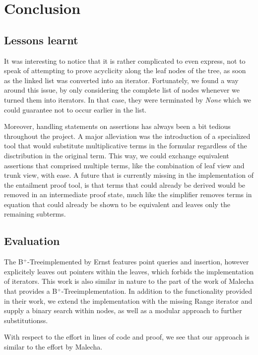\documentclass[a4paper,UKenglish,cleveref, autoref, thm-restate]{lipics-v2021}
\newcommand{\btree}{B$^+$-Tree}
\begin{document}
\section{Conclusion}
\label{sec:conclusion}

\subsection{Lessons learnt}

It was interesting to notice that it is rather complicated
to even express, not to speak of attempting to prove acyclicity
 along the leaf nodes of the tree, as soon as the linked list was converted into an iterator.
Fortunately, we found a way around this issue, by only considering
the complete list of nodes whenever we turned them into
iterators. In that case, they were terminated by \textit{None}
which we could guarantee not to occur earlier in the list.

Moreover, handling statements on assertions has always been
a bit tedious throughout the project.
A major alleviation was the introduction of a specialized tool
that would substitute multiplicative terms in the formular
regardless of the disctribution in the original term.
This way, we could exchange equivalent assertions that comprised
multiple terms, like the combination of leaf view and trunk view,
with ease.
A future that is currently missing in the implementation of the entailment
proof tool, is that terms that could already be derived
would be removed in an intermediate proof state,
much like the simplifier removes terms in equation that could
already be shown to be equivalent and leaves only the remaining subterms.

\subsection{Evaluation}


The \btree implemented by Ernst features point queries and insertion,
however explicitely leaves out pointers within the leaves,
which forbids the implementation of iterators.
This work is also similar in nature to the part of the work of Malecha
that provides a \btree implementation.
In addition to the functionality provided in their work, we extend
the implementation with the missing Range iterator
and supply a binary search within nodes, as well as a modular approach
to further substitutionss.

With respect to the effort in lines of code and proof, we see
that our approach is similar to the effort by Malecha.
\end{document}
